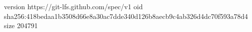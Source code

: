 version https://git-lfs.github.com/spec/v1
oid sha256:418bedaa1b3508d66e8a30ac7dde340d126b8aecb9c4ab326d4dc70f593a78d4
size 204791
